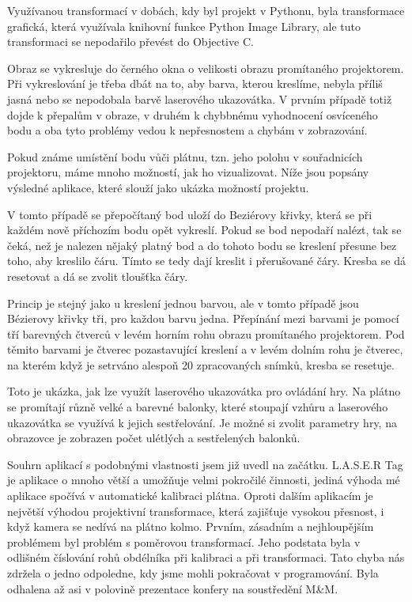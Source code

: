 \documentclass[twoside,12pt]{article}
\begin{document}
Využívanou transformací v dobách, kdy byl projekt v Pythonu, byla transformace grafická, která využívala knihovní funkce Python Image Library, ale tuto transformaci se nepodařilo převést do Objective C.

Obraz se vykresluje do černého okna o velikosti obrazu promítaného projektorem. Při vykreslování je třeba dbát na to, aby barva, kterou kreslíme, nebyla příliš jasná nebo se nepodobala barvě laserového ukazovátka. V prvním případě totiž dojde k přepalům v obraze, v druhém k chybbnému vyhodnocení osvíceného bodu a oba tyto problémy vedou k nepřesnostem a chybám v zobrazování.


Pokud známe umístění bodu vůči plátnu, tzn. jeho polohu v souřadnicích projektoru, máme mnoho možností, jak ho vizualizovat. Níže jsou popsány výsledné aplikace, které slouží jako ukázka možností projektu.

V tomto případě se přepočítaný bod uloží do Beziérovy křivky, která se při každém nově příchozím bodu opět vykreslí. Pokud se bod nepodaří nalézt, tak se čeká, než je nalezen nějaký platný bod a do tohoto bodu se kreslení přesune bez toho, aby kreslilo čáru. Tímto se tedy dají kreslit i přerušované čáry. Kresba se dá resetovat a dá se zvolit tloušťka čáry.

Princip je stejný jako u kreslení jednou barvou, ale v tomto případě jsou Bézierovy křivky tři, pro každou barvu jedna. Přepínání mezi barvami je pomocí tří barevných čtverců v levém horním rohu obrazu promítaného projektorem. Pod těmito barvami je čtverec pozastavující kreslení a v levém dolním rohu je čtverec, na kterém když je setrváno alespoň 20 zpracovaných snímků, kresba se resetuje.

Toto je ukázka, jak lze využít laserového ukazovátka pro ovládání hry. Na plátno se promítají různě velké a barevné balonky, které stoupají vzhůru a laserového ukazovátka se využívá k jejich sestřelování. Je možné si zvolit parametry hry, na obrazovce je zobrazen počet ulétlých a sestřelených balonků.

Souhrn aplikací s podobnými vlastnosti jsem již uvedl na začátku. L.A.S.E.R Tag je aplikace o mnoho větší a umožňuje velmi pokročilé činnosti, jediná výhoda mé aplikace spočívá v automatické kalibraci plátna. Oproti dalším aplikacím je největší výhodou projektivní transformace, která zajišťuje vysokou přesnost, i když kamera se nedívá na plátno kolmo.
Prvním, zásadním a nejhloupějším problémem byl problém s poměrovou transformací. Jeho podstata byla v odlišném číslování rohů obdélníka při kalibraci a při transformaci. Tato chyba nás zdržela o jedno odpoledne, kdy jsme mohli pokračovat v programování. Byla odhalena až asi v polovině prezentace konfery na soustředění M\&M. 
\end{document}
